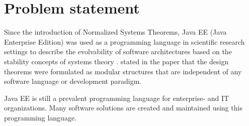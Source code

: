 \section{Problem statement} \label{problem_statement} 

Since the introduction of Normalized Systems Theorems, Java EE (Java Enterprise Edition)
was used as a programming language in scientific research settings to describe the
evolvability of software architectures based on the stability concepts of systems theory
\parencite[]{mannaert_towards_2012}. \citeauthor{mannaert_towards_2012} stated in the
paper that the design theorems were formulated as modular structures that are independent
of any software language or development paradigm.

Java EE is still a prevalent programming language for enterprise- and IT organizations.
Many software solutions are created and maintained using this programming language.
